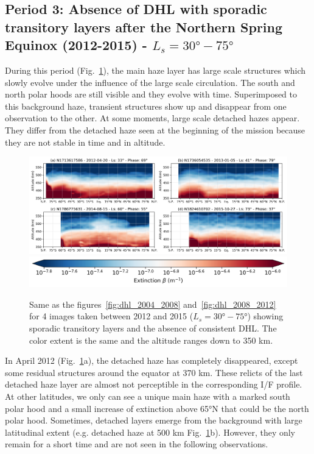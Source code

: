 \subsection{Period 3: Absence of DHL with sporadic transitory layers after the Northern Spring Equinox (2012-2015) - $L_s=\ang{30}-\ang{75}$}

During this period (Fig.~\ref{fig:dhl_2012_2015}), the main haze layer has large scale structures which slowly evolve under the influence of the
large scale circulation. The south and north polar hoods are still visible and they evolve
with time. Superimposed to this background haze, transient structures show up and disappear from one observation
to the other. At some moments, large scale detached hazes appear. They differ from the detached haze seen at the
beginning of the mission because they are not stable in time and in altitude.

\begin{figure}[!ht]
    \centering
    \includegraphics[width=\textwidth]{Fig/Lat_beta-2012_2015.png}
    \includegraphics[width=.5\textwidth]{Fig/Extinction_colorbar.png}\vspace{-.3cm}
    \caption{Same as the figures~\ref{fig:dhl_2004_2008} and~\ref{fig:dhl_2008_2012}
    for 4 images taken between 2012 and 2015 ($L_s=\ang{30}-\ang{75}$) showing sporadic
    transitory layers and the absence of consistent DHL.
    The color extent is the same and the altitude ranges down to 350 km.}
    \label{fig:dhl_2012_2015}
\end{figure}

In April 2012 (Fig.~\ref{fig:dhl_2012_2015}a), the detached haze has completely disappeared, except some residual
structures around the equator at 370 km.
These relicts of the last detached haze layer are almost not perceptible in the corresponding I/F profile. At other
latitudes, we only can see a unique main haze with a marked south polar hood and a small increase of extinction above
\ang{65}N that could be the north polar hood. Sometimes, detached layers emerge from the background with large latitudinal
extent (e.g. detached haze at 500 km Fig.~\ref{fig:dhl_2012_2015}b). However, they only remain for a short time
and are not seen in the following observations.

